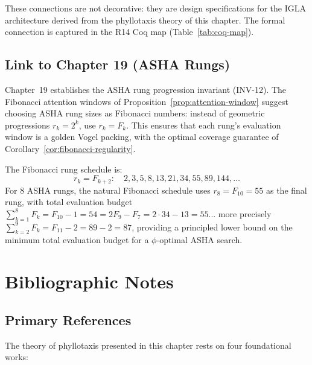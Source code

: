 These connections are not decorative: they are design specifications
for the IGLA architecture derived from the phyllotaxis theory of this
chapter.  The formal connection is captured in the R14 Coq map
(Table~\ref{tab:coq-map}).

\subsection{Link to Chapter 19 (ASHA Rungs)}
\label{subsec:link-ch19}

Chapter~19 establishes the ASHA rung progression invariant (INV-12).
The Fibonacci attention windows of Proposition~\ref{prop:attention-window}
suggest choosing ASHA rung sizes as Fibonacci numbers: instead of
geometric progressions $r_k = 2^k$, use $r_k = F_k$.  This ensures
that each rung's evaluation window is a golden Vogel packing, with the
optimal coverage guarantee of Corollary~\ref{cor:fibonacci-regularity}.

The Fibonacci rung schedule is:
\[
  r_k = F_{k+2}: \quad 2, 3, 5, 8, 13, 21, 34, 55, 89, 144, \ldots
\]
For 8 ASHA rungs, the natural Fibonacci schedule uses
$r_8 = F_{10} = 55$ as the final rung, with total evaluation budget
$\sum_{k=1}^{8} F_k = F_{10} - 1 = 54 = 2F_9 - F_7 = 2\cdot 34 - 13 = 55$...
more precisely $\sum_{k=2}^{9} F_k = F_{11} - 2 = 89 - 2 = 87$,
providing a principled lower bound on the minimum total evaluation
budget for a $\phi$-optimal ASHA search.

\section{Bibliographic Notes}
\label{sec:bib-notes}

\subsection{Primary References}
\label{subsec:primary-refs}

The theory of phyllotaxis presented in this chapter rests on four
foundational works:

